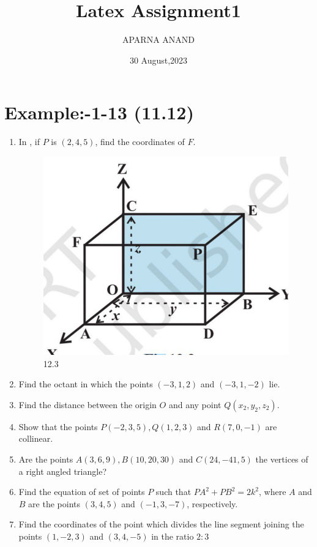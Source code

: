 \documentclass{article}
\theoremstyle{remark}
\begin{document}
\title{Latex Assignment1}                            \author{APARNA ANAND}
\date{30 August,2023}
\maketitle
\section*{Example:-1-13 (11.12)}
\begin{enumerate}
\item In , if $P$ is $(2,4,5)$, find the coordinates of $F$.
\begin{figure}[h]
\centering
\includegraphics[width=\columnwidth]{figs/12.3.png}
\caption{12.3}
\label{fig:12.3}
\end{figure}
\item Find the octant in which the points $(-3,1,2)$ and $(-3,1,-2)$ lie.
\item Find the distance between the origin $O$ and any point $Q(x_2,y_2,z_2)$.
\item Show that the points $P(-2,3,5), Q(1,2,3)$ and $R(7,0,-1)$ are collinear. 
\item Are the points $A(3,6,9), B(10,20,30)$ and $C(24,-41,5)$ the vertices of a right angled triangle?
\item Find the equation of set of points $P$ such that $PA^2+PB^2=2k^2$, where $A$ and $B$ are the points $(3,4,5)$ and $(-1,3,-7)$, respectively.
\item Find the coordinates of the point which divides the line segment joining the points $(1,-2,3)$ and $(3,4,-5)$ in the ratio $2:3$

\end{enumerate}
\end{document}
